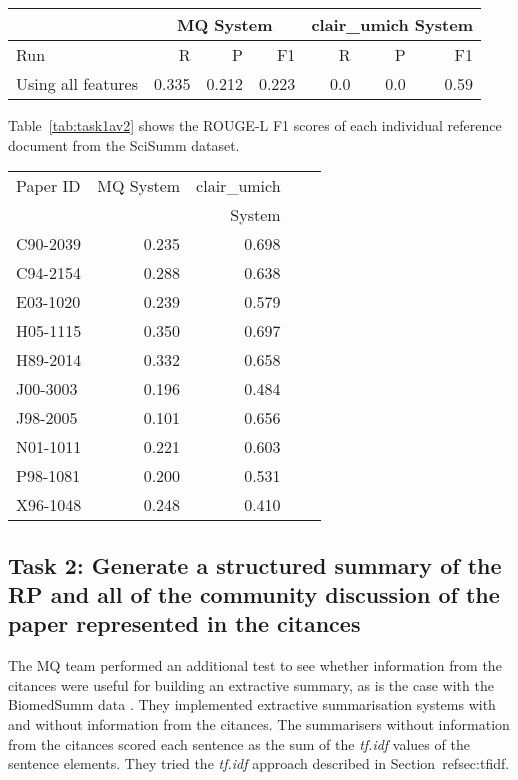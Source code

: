 \documentclass[11pt]{article}
\begin{document}
\begin{table*}
\centering
	\begin{tabular}{|l|r|r|r|r|r|r|}
	\hline
	& \multicolumn{3}{|c|}{MQ System} & \multicolumn{3}{|c|}{clair\_umich System}\\
	\hline
	Run & R & P & F1 & R & P & F1\\
	\hline
	Using all features & 0.335 & 0.212 & 0.223 & 0.0 & 0.0 & 0.59\\
	\hline
	\end{tabular}
\caption{ROUGE-L results of the participating systems for task 1a}
\label{tab:task1a}
\end{table*}

Table~\ref{tab:task1av2} shows the ROUGE-L F1 scores of each individual reference document from the SciSumm dataset.

\begin{table*}
  \centering
  \begin{tabular}{|l|r|r|r|r|}
  	\hline
	Paper ID & MQ System & clair\_umich \\
	&	&	System\\
	\hline
	C90-2039 & 0.235 & 0.698\\ 
	C94-2154 & 0.288 & 0.638\\
	E03-1020 & 0.239 & 0.579\\
	H05-1115 & 0.350 & 0.697\\
	H89-2014 & 0.332 & 0.658\\
	J00-3003 & 0.196 & 0.484\\
	J98-2005 & 0.101 & 0.656\\
	N01-1011 & 0.221 & 0.603\\
	P98-1081 & 0.200 & 0.531\\
	X96-1048 & 0.248 & 0.410\\
	\hline
  \end{tabular}
\caption{ROUGE-L F1 results for individual topics 1a}
\label{tab:task1av2}
\end{table*}

\subsection{Task 2: Generate a structured summary of the RP and all of the community discussion of the paper represented in the citances}

The MQ team performed an additional test to see  whether information from the citances were useful for building an extractive summary, as is the case with the BiomedSumm data \cite{Molla:ALTA2014}. They implemented extractive summarisation systems with and without information from the citances. 
The summarisers without information from the citances scored each sentence as the sum of the \emph{tf.idf} values of the sentence
elements. They tried the \emph{tf.idf} approach described in Section~ref{sec:tfidf}.
\end{document}
